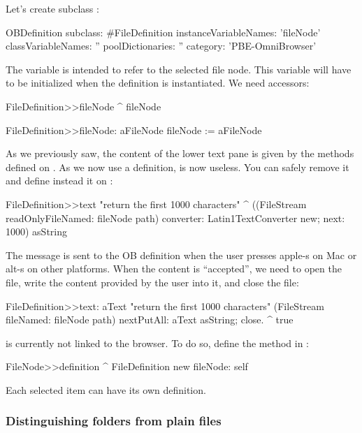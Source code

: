 \documentclass[a4paper,10pt,twoside]{book}
\begin{document}
Let's create subclass :

\begin{code}{}    
OBDefinition subclass: #FileDefinition
	instanceVariableNames: 'fileNode'
	classVariableNames: ''
	poolDictionaries: ''
	category: 'PBE-OmniBrowser'
\end{code}

The variable  is intended to refer to the selected file node. This variable will have to be initialized when the definition is instantiated. We need accessors:

\begin{code}{}    
FileDefinition>>fileNode
	^ fileNode

FileDefinition>>fileNode: aFileNode
	fileNode := aFileNode
\end{code}

As we previously saw, the content of the lower text pane is given by the  methods defined on . As we now use a definition,  is now useless. You can safely remove it and define instead it on :

\begin{code}{}
FileDefinition>>text
	"return the first 1000 characters"
     ^ ((FileStream readOnlyFileNamed: fileNode path) converter: Latin1TextConverter new; 
              next: 1000) asString
\end{code}

The message  is sent to the OB definition when the user presses apple-s  on Mac or alt-s on other platforms. When the content is ``accepted'', we need to open the file, write the content provided by the user into it, and close the file:

\begin{code}{}
FileDefinition>>text: aText
	"return the first 1000 characters"
     (FileStream fileNamed: fileNode path) 
				nextPutAll: aText asString;
				close.
	^ true
\end{code}

 is currently not linked to the browser. To do so, define the method  in :

\begin{code}{}
FileNode>>definition
	^ FileDefinition new fileNode: self
\end{code}

Each selected item can have its own definition. 

\subsubsection{Distinguishing folders from plain files}
\end{document}
